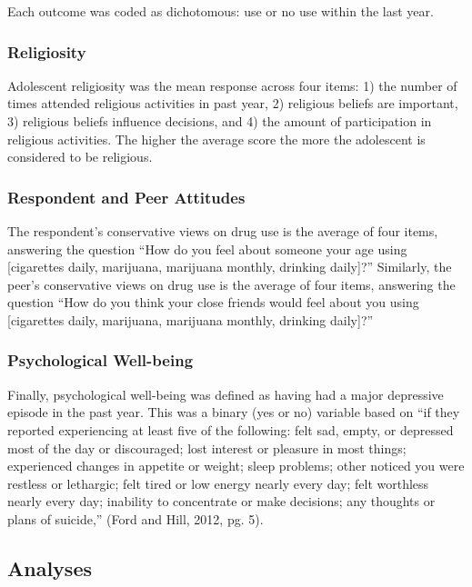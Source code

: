 \documentclass[]{DissertateUSU}
\begin{document}
\noindent Each outcome was coded as dichotomous: use or no use within
the last year.

\subsubsection{Religiosity}\label{religiosity}

Adolescent religiosity was the mean response across four items: 1) the
number of times attended religious activities in past year, 2) religious
beliefs are important, 3) religious beliefs influence decisions, and 4)
the amount of participation in religious activities. The higher the
average score the more the adolescent is considered to be religious.

\subsubsection{Respondent and Peer
Attitudes}\label{respondent-and-peer-attitudes}

The respondent's conservative views on drug use is the average of four
items, answering the question ``How do you feel about someone your age
using {[}cigarettes daily, marijuana, marijuana monthly, drinking
daily{]}?'' Similarly, the peer's conservative views on drug use is the
average of four items, answering the question ``How do you think your
close friends would feel about you using {[}cigarettes daily, marijuana,
marijuana monthly, drinking daily{]}?''

\subsubsection{Psychological Well-being}\label{psychological-well-being}

Finally, psychological well-being was defined as having had a major
depressive episode in the past year. This was a binary (yes or no)
variable based on ``if they reported experiencing at least five of the
following: felt sad, empty, or depressed most of the day or discouraged;
lost interest or pleasure in most things; experienced changes in
appetite or weight; sleep problems; other noticed you were restless or
lethargic; felt tired or low energy nearly every day; felt worthless
nearly every day; inability to concentrate or make decisions; any
thoughts or plans of suicide,'' (Ford and Hill, 2012, pg. 5).

\subsection{Analyses}\label{analyses}
\end{document}
